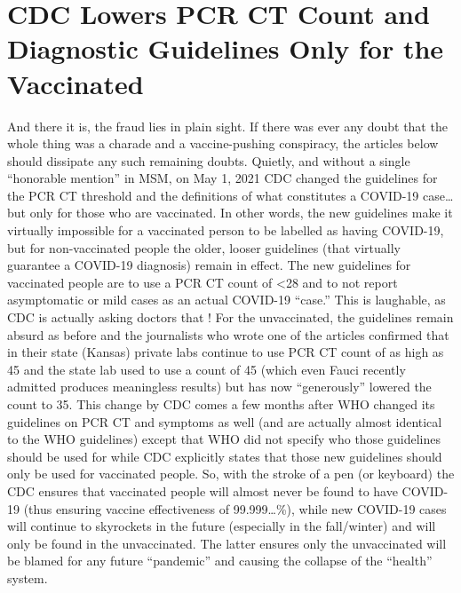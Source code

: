 \chapter{CDC Lowers PCR CT Count and Diagnostic Guidelines Only for the Vaccinated}

\begin{refsection}

And there it is, the fraud lies in plain sight. If there was ever any doubt that the whole thing was a charade and a vaccine-pushing conspiracy, the articles below should dissipate any such remaining doubts. Quietly, and without a single \enquote{honorable mention} in MSM, on May 1, 2021 CDC changed the guidelines for  the PCR CT threshold and the definitions of what constitutes a COVID-19 case\dots{} but only for those who are vaccinated. In other words, the new guidelines make it virtually impossible for a vaccinated person to be labelled as having COVID-19, but for non-vaccinated people the older, looser guidelines (that virtually guarantee a COVID-19 diagnosis) remain in effect. The new guidelines for vaccinated people are to use a PCR CT count of <28 and to not report asymptomatic or mild cases as an actual COVID-19 \enquote{case.} This is laughable, as CDC is actually asking doctors that ! For the unvaccinated, the guidelines remain absurd as before and the journalists who wrote one of the articles confirmed that in their state (Kansas) private labs continue to use PCR CT count of as high as 45 and the state lab used to use a count of 45 (which even Fauci recently admitted produces meaningless results) but has now \enquote{generously} lowered the count to 35. This change by CDC comes a few months after WHO changed its guidelines on PCR CT and symptoms as well (and are actually almost identical to the WHO guidelines) except that WHO did not specify who those guidelines should be used for while CDC explicitly states that those new guidelines should only be used for vaccinated people. So, with the stroke of a pen (or keyboard) the CDC ensures that vaccinated people will almost never be found to have COVID-19 (thus ensuring vaccine effectiveness of 99.999\dots{}\%), while new COVID-19 cases will continue to skyrockets in the future (especially in the fall/winter) and will only be found in the unvaccinated. The latter ensures only the unvaccinated will be blamed for any future \enquote{pandemic} and causing the collapse of the \enquote{health} system.\textsuperscript{\cite{urls0av8bns}}


\end{refsection}
